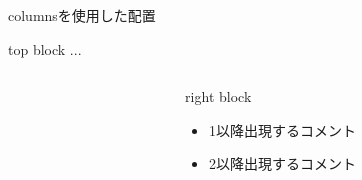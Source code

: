 \documentclass[12pt, unicode]{beamer}
\begin{document}
\begin{frame}{columnsを使用した配置}
  \begin{block}{top block}
    ...
  \end{block}
  \begin{columns}[c]  %
    \begin{column}{0.3\textwidth} %
    \end{column}
    \begin{column}{0.65\textwidth} %
      \begin{block}{right block}
        \begin{itemize}
          \item<1-> 1以降出現するコメント
          \item<2-> 2以降出現するコメント
        \end{itemize}
      \end{block}
    \end{column}
  \end{columns}
\end{frame}

\end{document}
